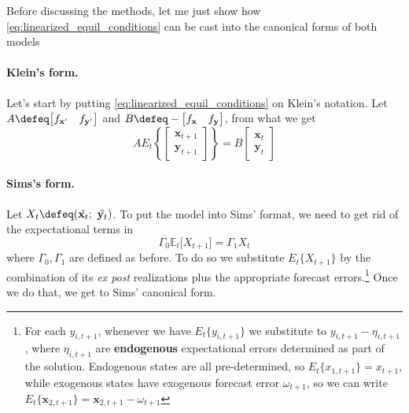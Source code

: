\documentclass[a4paper,10pt]{article}  %
\begin{document}
Before discussing the methods, let me just show how \eqref{eq:linearized_equil_conditions} can be cast into the canonical forms of both models

\paragraph{\normalfont\bf Klein's form.} %
\label{par:klein}
Let's start by putting \eqref{eq:linearized_equil_conditions} on Klein's notation. Let $ A \defeq \big[f_{ \mathbf{x}' }
\quad f_{ \mathbf{y}' } \big] $  and $ B \defeq - \big[f_{ \mathbf{x} } \quad  f_{ \mathbf{y} } \big] $, from what we
get
\begin{equation}
   \label{eq:klein}
   A E_t \left\{ 
   \begin{bmatrix}
      \mathbf{x}_{t+1} \\ \mathbf{y}_{t+1}
   \end{bmatrix}
   \right\} = 
   B 
   \begin{bmatrix}
      \mathbf{x}_{t} \\ \mathbf{y}_t 
   \end{bmatrix}
\end{equation}

\paragraph{\normalfont\bf Sims's form.} %
\label{par:sims_form}

Let $X_t \defeq ( \tilde{\mathbf{x}_t}; \ \tilde{\mathbf{y}_t} )$. To put the model into Sims' format, we need to get rid of
the expectational terms in
\begin{equation*}
   \Gamma_0 \mathbb{E}_t \Big[ X_{t+1} \Big] = \Gamma_1 X_t
\end{equation*}
where $ \Gamma_0, \Gamma_1$ are defined as before. To do so we substitute $ E_{t} \big\{X_{t+1}\big\} $ by the
combination of its \emph{ex post} realizations plus the appropriate forecast errors.\footnote{%
   For each $y_{i,t+1}$, whenever we have $ E_{t} \big\{ y_{i,t+1} \big\}  $  we substitute to $ y_{i,t+1} - \eta_{i,t+1}$, 
   where $\eta_{i,t+1} $  are \textbf{endogenous} expectational errors determined as part of the solution.
   Endogenous states are all pre-determined, so $ E_t\{x_{1,t+1}\} = x_{t+1} $, while exogenous states have exogenous
   forecast error $ \omega_{t+1} $, so we can write $ E_t \{\mathbf{x}_{2,t+1} \} = \mathbf{x}_{2,t+1} - \omega_{t+1}$
   }
Once we do that, we get to Sims' canonical form.
\end{document}
